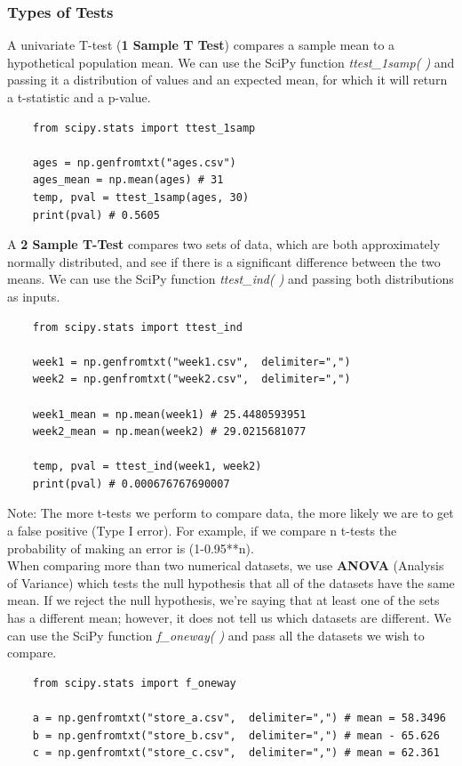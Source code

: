 \documentclass[11pt, a4paper]{article}
\begin{document}
\begin{spacing}{1.1}
	\subsubsection{Types of Tests}
	A univariate T-test (\textbf{1 Sample T Test}) compares a sample mean to a hypothetical population mean. We can use the SciPy function \textit{ttest\_1samp( )} and passing it a distribution of values and an expected mean, for which it will return a t-statistic and a p-value. 
	\begin{lstlisting}
	from scipy.stats import ttest_1samp
	
	ages = np.genfromtxt("ages.csv")
	ages_mean = np.mean(ages) # 31
	temp, pval = ttest_1samp(ages, 30)
	print(pval) # 0.5605 \end{lstlisting}\vspace*{1mm}
	A \textbf{2 Sample T-Test} compares two sets of data, which are both approximately normally distributed, and see if there is a significant difference between the two means. We can use the SciPy function \textit{ttest\_ind( )} and passing both distributions as inputs.
	\begin{lstlisting}
	from scipy.stats import ttest_ind
	
	week1 = np.genfromtxt("week1.csv",  delimiter=",")
	week2 = np.genfromtxt("week2.csv",  delimiter=",")
	
	week1_mean = np.mean(week1) # 25.4480593951
	week2_mean = np.mean(week2) # 29.0215681077
	
	temp, pval = ttest_ind(week1, week2)
	print(pval) # 0.000676767690007 \end{lstlisting}\vspace*{1mm}
	Note: The more t-tests we perform to compare data, the more likely we are to get a false positive (Type I error). For example, if we compare n t-tests the probability of making an error is (1-0.95**n). \vspace*{2mm} \\
	When comparing more than two numerical datasets, we use \textbf{ANOVA} (Analysis of Variance) which tests the null hypothesis that all of the datasets have the same mean. If we reject the null hypothesis, we’re saying that at least one of the sets has a different mean; however, it does not tell us which datasets are different. We can use the SciPy function \textit{f\_oneway( )} and pass all the datasets we wish to compare.
	\begin{lstlisting}
	from scipy.stats import f_oneway
	
	a = np.genfromtxt("store_a.csv",  delimiter=",") # mean = 58.3496
	b = np.genfromtxt("store_b.csv",  delimiter=",") # mean - 65.626
	c = np.genfromtxt("store_c.csv",  delimiter=",") # mean = 62.361
	

\end{lstlisting}
\end{spacing}
\end{document}
